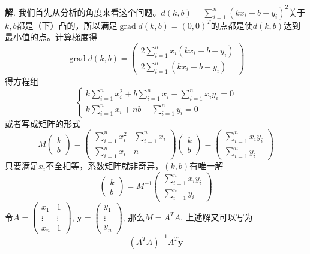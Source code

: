 {\bf 解}. 我们首先从分析的角度来看这个问题。$d(k, b) = \sum\limits_{i=1}^n (kx_i + b - y_i)^2$关于$k, b$都是（下）凸的，所以满足$\operatorname{grad} d(k, b) = (0,0)^T$的点都是使$d(k, b)$达到最小值的点。计算梯度得
$$
\operatorname{grad} d(k, b) = \begin{pmatrix} 2 \sum\limits_{i=1}^n x_i (kx_i + b - y_i) \\ 2 \sum\limits_{i=1}^n (kx_i + b - y_i) \end{pmatrix}
$$
得方程组
$$
\begin{cases}
k \sum\limits_{i=1}^n x_i^2 + b \sum\limits_{i=1}^n x_i - \sum\limits_{i=1}^n x_i y_i = 0 \\
k \sum\limits_{i=1}^n x_i + nb - \sum\limits_{i=1}^n y_i = 0
\end{cases}
$$
或者写成矩阵的形式
$$
M \begin{pmatrix} k \\ b \end{pmatrix} = \begin{pmatrix} \sum\limits_{i=1}^n x_i^2 & \sum\limits_{i=1}^n x_i \\ \sum\limits_{i=1}^n x_i & n \end{pmatrix} \begin{pmatrix} k \\ b \end{pmatrix} = \begin{pmatrix} \sum\limits_{i=1}^n x_i y_i \\ \sum\limits_{i=1}^n y_i \end{pmatrix}
$$
只要满足$x_i$不全相等，系数矩阵就非奇异，$(k, b)$有唯一解
$$\begin{pmatrix} k \\ b \end{pmatrix} = M^{-1}\begin{pmatrix} \sum\limits_{i=1}^n x_i y_i \\ \sum\limits_{i=1}^n y_i \end{pmatrix}$$
令$A = \begin{pmatrix} x_1 & 1 \\ \vdots & \vdots \\ x_n & 1 \end{pmatrix}$, $\mathbf{y} = \begin{pmatrix} y_1 \\ \vdots \\ y_n \end{pmatrix}$, 那么$M = A^TA$, 上述解又可以写为
$$(A^TA)^{-1}A^T\mathbf{y}$$

